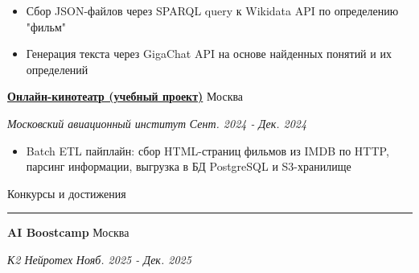 \documentclass[14pt, a4paper, oneside]{extarticle}
\begin{document}

\begin{itemize}
	\vspace{-2\intextsep}
	\item Сбор JSON-файлов через SPARQL query к Wikidata API по определению "фильм"
	\vspace{-0.8\intextsep}
	\item Генерация текста через GigaChat API на основе найденных понятий и их определений
\end{itemize}


\begin{flushleft}
	\vspace{-\intextsep}
	\quad
	\href{https://github.com/Crazy5202/Python_project}{\textbf{Онлайн-кинотеатр (учебный проект)}}
	\hfill
	Москва
\end{flushleft}

\begin{flushleft}
	\vspace{-1\intextsep}
	\quad
	\textit{Московский авиационный институт}
	\hfill
	\textit{\small Сент. 2024 - Дек. 2024}
\end{flushleft}


\begin{itemize}
	\vspace{-2\intextsep}
	\item Batch ETL пайплайн: сбор HTML-страниц фильмов из IMDB по HTTP,
    парсинг информации, выгрузка в БД PostgreSQL и S3-хранилище
\end{itemize}


\begin{flushleft}
	\vspace{-\intextsep}
	\large Конкурсы и достижения
\end{flushleft}

\vspace{-0.8\intextsep}
\hrule


\begin{flushleft}
	\vspace{-0.8\intextsep}
	\quad
	\textbf{AI Boostcamp}
	\hfill
	Москва
\end{flushleft}

\begin{flushleft}
	\vspace{-1\intextsep}
	\quad
	\textit{К2 Нейротех}
	\hfill
	\textit{\small Нояб. 2025 - Дек. 2025}
\end{flushleft}
\end{document}
